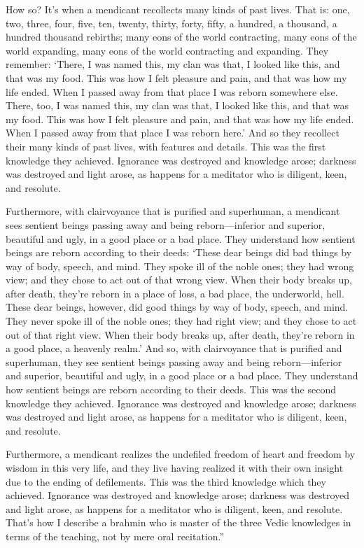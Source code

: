 \documentclass[12pt,openany]{book}%
\begin{document}
How so? It’s when a mendicant recollects many kinds of past lives. That is: one, two, three, four, five, ten, twenty, thirty, forty, fifty, a hundred, a thousand, a hundred thousand rebirths; many eons of the world contracting, many eons of the world expanding, many eons of the world contracting and expanding. They remember: ‘There, I was named this, my clan was that, I looked like this, and that was my food. This was how I felt pleasure and pain, and that was how my life ended. When I passed away from that place I was reborn somewhere else. There, too, I was named this, my clan was that, I looked like this, and that was my food. This was how I felt pleasure and pain, and that was how my life ended. When I passed away from that place I was reborn here.’ And so they recollect their many kinds of past lives, with features and details. This was the first knowledge they achieved. Ignorance was destroyed and knowledge arose; darkness was destroyed and light arose, as happens for a meditator who is diligent, keen, and resolute. 

Furthermore, with clairvoyance that is purified and superhuman, a mendicant sees sentient beings passing away and being reborn—inferior and superior, beautiful and ugly, in a good place or a bad place. They understand how sentient beings are reborn according to their deeds: ‘These dear beings did bad things by way of body, speech, and mind. They spoke ill of the noble ones; they had wrong view; and they chose to act out of that wrong view. When their body breaks up, after death, they’re reborn in a place of loss, a bad place, the underworld, hell. These dear beings, however, did good things by way of body, speech, and mind. They never spoke ill of the noble ones; they had right view; and they chose to act out of that right view. When their body breaks up, after death, they’re reborn in a good place, a heavenly realm.’ And so, with clairvoyance that is purified and superhuman, they see sentient beings passing away and being reborn—inferior and superior, beautiful and ugly, in a good place or a bad place. They understand how sentient beings are reborn according to their deeds. This was the second knowledge they achieved. Ignorance was destroyed and knowledge arose; darkness was destroyed and light arose, as happens for a meditator who is diligent, keen, and resolute. 

Furthermore, a mendicant realizes the undefiled freedom of heart and freedom by wisdom in this very life, and they live having realized it with their own insight due to the ending of defilements. This was the third knowledge which they achieved. Ignorance was destroyed and knowledge arose; darkness was destroyed and light arose, as happens for a meditator who is diligent, keen, and resolute. That’s how I describe a brahmin who is master of the three Vedic knowledges in terms of the teaching, not by mere oral recitation.” 
\end{document}
